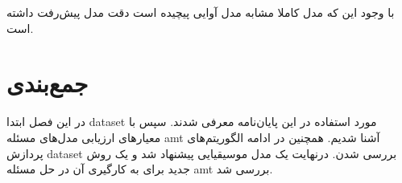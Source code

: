 با وجود این که مدل کاملا مشابه مدل آوایی پیچیده است دقت مدل پیش‌رفت داشته است.

\section{جمع‌بندی}
در این فصل ابتدا \gls{dataset} مورد استفاده در این پایان‌نامه معرفی شدند. سپس با
معیارهای ارزیابی مدل‌های مسئله \gls{amt} آشنا شدیم. همچنین در ادامه الگوریتم‌های
پردازش \gls{dataset} بررسی شدن. درنهایت یک مدل موسیقیایی پیشنهاد شد و یک روش
جدید برای به کارگیری آن در حل مسئله \gls{amt} بررسی شد.